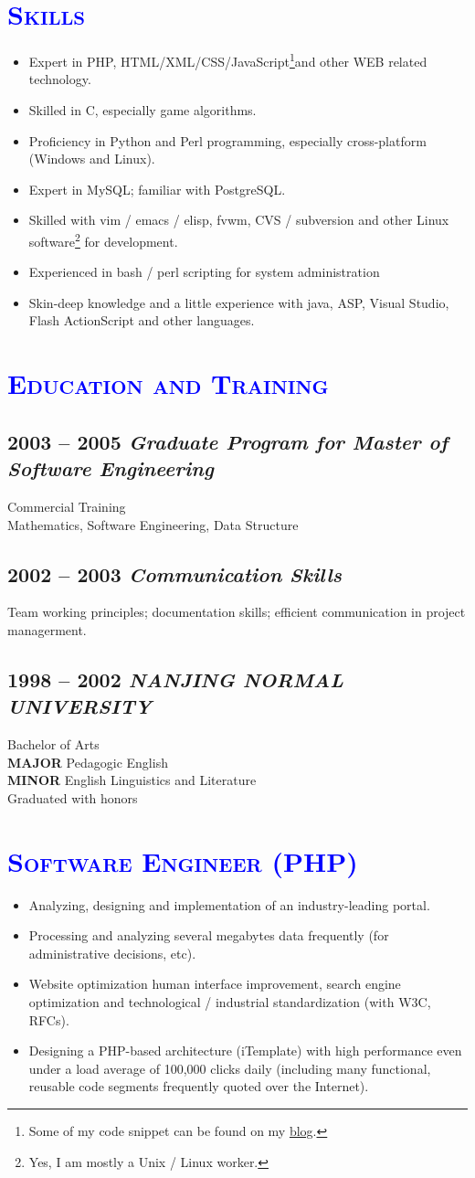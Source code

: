 \documentclass[a4paper,12pt]{article}
\newcommand{\company}[1]{%
  \textsl{#1}}
\newcommand{\itembf}[1]{%
  \textbf{\textcolor{bfcolor}{#1}}}
\newcommand{\ssection}[1]{%
  \section[#1]{\normalsize\scshape\textcolor{blue}{#1}}}
\newcommand{\ssubsection}[1]{%
  \subsection[#1]{\normalsize\textbf #1}}
\begin{document}
\ssection{Skills}
\begin{itemize}
	\item Expert in PHP, HTML/XML/CSS/JavaScript\footnote{Some of my code snippet can be found on my \href{http://blog.csdn.net/jerryfleming}{blog}.}and other WEB related technology.
	\item Skilled in C, especially game algorithms.
	\item Proficiency in Python and Perl programming, especially cross-platform (Windows and Linux).
	\item Expert in MySQL; familiar with PostgreSQL.
	\item Skilled with vim / emacs / elisp, fvwm, CVS / subversion and other Linux software\footnote{Yes, I am mostly a Unix / Linux worker.} for development. 
	\item Experienced in bash / perl scripting for system administration
	\item Skin-deep knowledge and a little experience with java, ASP, Visual Studio, Flash ActionScript and other languages.
\end{itemize}

\ssection{Education and Training}
	\ssubsection{2003 -- 2005 \company{Graduate Program for Master of Software Engineering}}
	Commercial Training\\
	Mathematics, Software Engineering, Data Structure

	\ssubsection{2002 -- 2003 \company{Communication Skills}}
	Team working principles; documentation skills; efficient communication in project managerment.

	\ssubsection{1998 -- 2002 \company{NANJING NORMAL UNIVERSITY}}
	Bachelor of Arts\\
	\itembf{MAJOR} Pedagogic English\\
	\itembf{MINOR} English Linguistics and Literature\\
	Graduated with honors

\ssection{Software Engineer (PHP)}
\begin{itemize}
	\item Analyzing, designing and implementation of an industry-leading portal.
	\item Processing and analyzing several megabytes data frequently (for administrative decisions, etc).
	\item Website optimization human interface improvement, search engine optimization and technological / industrial standardization (with W3C, RFCs).
	\item Designing a PHP-based architecture (iTemplate) with high performance even under a load average of 100,000 clicks daily (including many functional, reusable code segments frequently quoted over the Internet).
\end{itemize}
\end{document}
